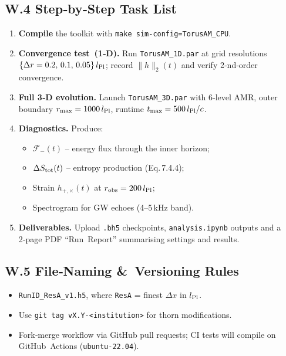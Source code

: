 \documentclass{article}
\begin{document}
\subsection{W.4  Step‑by‑Step Task List}
\begin{enumerate}[label=\textbf{T\arabic*}.,leftmargin=13mm]
\item \textbf{Compile} the toolkit with \texttt{make sim-config=TorusAM\_CPU}.
\item \textbf{Convergence test (1‑D).}  
      Run \texttt{TorusAM\_1D.par} at grid resolutions  
      $\{\Delta r=0.2,\,0.1,\,0.05\}\,l_{\rm Pl}$;  
      record $\|h\|_2(t)$ and verify 2‑nd‑order convergence.
\item \textbf{Full 3‑D evolution.}  
      Launch \texttt{TorusAM\_3D.par} with 6‑level AMR, outer boundary  
      $r_{\max}=1000\,l_{\rm Pl}$, runtime $t_{\max}=500\,l_{\rm Pl}/c$.
\item \textbf{Diagnostics.}  
      Produce:
      \begin{itemize}
        \item $\mathcal{F}_{-}(t)$ – energy flux through the inner horizon;
        \item $\Delta S_{\rm tot}(t)$ – entropy production (Eq.\,7.4.4);
        \item Strain $h_{+,\times}(t)$ at $r_{\rm obs}=200\,l_{\rm Pl}$;
        \item Spectrogram for GW echoes (4–5 kHz band).
      \end{itemize}
\item \textbf{Deliverables.}  
      Upload \texttt{.bh5} checkpoints, \texttt{analysis.ipynb} outputs and a  
      2‑page PDF “Run Report” summarising settings and results.
\end{enumerate}

\subsection{W.5  File‑Naming \& Versioning Rules}
\begin{itemize}
\item \texttt{RunID\_ResA\_v1.h5}, where \texttt{ResA} = finest $\Delta x$ in $l_{\rm Pl}$.
\item Use \texttt{git tag vX.Y‐<institution>} for thorn modifications.
\item Fork‑merge workflow via GitHub pull requests; CI tests will compile on
      GitHub Actions (\texttt{ubuntu‑22.04}).
\end{itemize}
\end{document}
